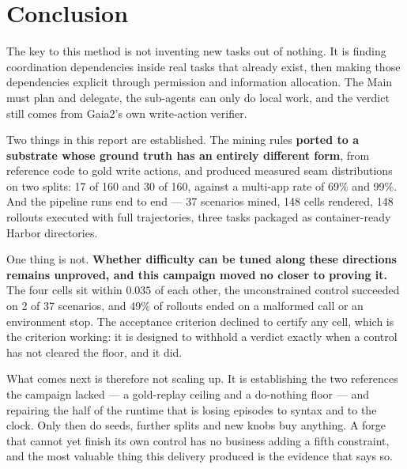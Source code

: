 \documentclass[11pt,a4paper]{article}
\begin{document}
\section{Conclusion}

The key to this method is not inventing new tasks out of nothing. It is finding coordination dependencies inside real tasks that already exist, then making those dependencies explicit through permission and information allocation. The Main must plan and delegate, the sub-agents can only do local work, and the verdict still comes from Gaia2's own write-action verifier.

Two things in this report are established. The mining rules \textbf{ported to a substrate whose ground truth has an entirely different form}, from reference code to gold write actions, and produced measured seam distributions on two splits: 17 of 160 and 30 of 160, against a multi-app rate of 69\% and 99\%. And the pipeline runs end to end --- 37 scenarios mined, 148 cells rendered, 148 rollouts executed with full trajectories, three tasks packaged as container-ready Harbor directories.

One thing is not. \textbf{Whether difficulty can be tuned along these directions remains unproved, and this campaign moved no closer to proving it.} The four cells sit within $0.035$ of each other, the unconstrained control succeeded on 2 of 37 scenarios, and 49\% of rollouts ended on a malformed call or an environment stop. The acceptance criterion declined to certify any cell, which is the criterion working: it is designed to withhold a verdict exactly when a control has not cleared the floor, and it did.

What comes next is therefore not scaling up. It is establishing the two references the campaign lacked --- a gold-replay ceiling and a do-nothing floor --- and repairing the half of the runtime that is losing episodes to syntax and to the clock. Only then do seeds, further splits and new knobs buy anything. A forge that cannot yet finish its own control has no business adding a fifth constraint, and the most valuable thing this delivery produced is the evidence that says so.
\end{document}
